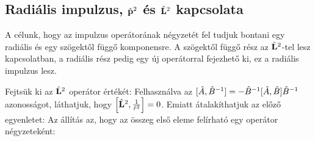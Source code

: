   \subsection{Radiális impulzus, $\hat{\mathbf{p}}^2$ és $\hat{\mathbf{L}}^2$ kapcsolata}
   
   A célunk, hogy az impulzus operátorának négyzetét fel tudjuk bontani egy radiális és egy szögektől függő komponensre. A szögektől függő rész az $\hat{\mathbf{L}}^2$-tel lesz kapcsolatban, a radiális rész pedig egy új operátorral fejezhető ki, ez a radiális impulzus lesz. 
   
   Fejtsük ki az $\hat{\mathbf{L}}^2$ operátor értékét:
   Felhasználva az $[\hat{A},\hat{B}^{-1}]=-\hat{B}^{-1}[\hat{A},\hat{B}]\hat{B}^{-1}$ azonosságot, láthatjuk, hogy $\left[\hat{\mathbf{L}}^2,\frac{1}{\hat{r}^2}\right]=0$. Emiatt átalakíthatjuk az előző egyenletet:
   Az állítás az, hogy az összeg első eleme felírható egy operátor négyzeteként:
